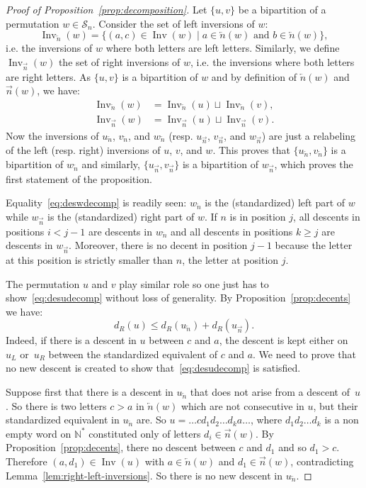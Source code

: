 \documentclass[Unicode]{cedram-alco}
\theoremstyle{definition}
\newcommand{\Sym}[1]{\mathcal{S}_{#1}}
\newcommand{\Symn}{\Sym{n}}
\DeclareMathOperator{\invs}{Inv}
\newcommand{\R}{{\overrightarrow{n}}}
\newcommand{\LL}{{\overleftarrow{n}}}
\newcommand{\dd}{d_R}
\begin{document}
\begin{proof}[Proof of Proposition~\ref{prop:decomposition}]
Let $\lbrace u, v \rbrace$ be a bipartition of a permutation $w \in \Symn$. Consider the set of left inversions of $w$:
$$
\invs_\LL(w)= \lbrace (a,c) \in \invs(w)\mid a \in \LL(w) \text{ and } b \in \LL(w) \rbrace,
$$
i.e. the inversions of $w$ where both letters are left letters. Similarly, we define $\invs_\R(w)$ the set of right inversions of $w$, i.e. the inversions where both letters are right letters. As $\lbrace u, v \rbrace$ is a bipartition of $w$ and by definition of  $\LL(w)$ and $\R(w)$, we have:
\begin{align*}
\invs_\LL(w) &= \invs_\LL(u) \sqcup \invs_\LL(v), \\
\invs_\R(w) &= \invs_\R(u) \sqcup \invs_\R(v).
\end{align*}
Now the inversions of $u_\LL$, $v_\LL$, and $w_\LL$ (resp. $u_\R$, $v_\R$, and $w_\R$) are just a relabeling of the left (resp. right) inversions of $u$, $v$, and $w$. This proves that $\lbrace u_\LL, v_\LL \rbrace$ is a bipartition of $w_\LL$ and similarly, $\lbrace u_\R, v_\R \rbrace$ is a bipartition of $w_\R$, which proves the first statement of the proposition. 


Equality~\eqref{eq:deswdecomp} is readily seen: $w_\LL$ is the (standardized) left part of $w$ while $w_\R$ is the (standardized) right part of $w$. If $n$ is in position $j$, all descents in positions $i < j-1$ are descents in $w_\LL$ and all descents in positions $k \geq j$ are descents in $w_\R$. Moreover, there is no decent in position $j-1$ because the letter at this position is strictly smaller than $n$, the letter at position $j$.

The permutation $u$ and $v$ play similar role so one just has to show~\eqref{eq:desudecomp} without loss of generality. By Proposition~\ref{prop:decents} we have:
\begin{equation*}
\dd(u) \leq \dd(u_\LL) + \dd(u_\R).
\end{equation*} 
Indeed, if there is a descent in $u$ between $c$ and $a$, the descent is kept either on~$u_L$ or~$u_R$ between the standardized equivalent of $c$ and $a$. We need to prove that no new descent is created to show that~\eqref{eq:desudecomp} is satisfied. 

Suppose first that there is a descent in $u_\LL$ that does not arise from a descent of~$u$. So there is two letters $c > a$ in $\LL(w)$ which are not consecutive in $u$, but their standardized equivalent in $u_\LL$ are. So $u=\dots c d_1d_2\dots d_k a\dots$, where $d_1d_2\dots d_k$ is a non empty word on $\mathbb N^*$ constituted only of letters  $d_i\in\R(w)$. By Proposition~\ref{prop:decents}, there no descent between $c$ and $d_1$ and so $d_1 > c$. Therefore $(a,d_1)\in\invs(u)$ with $a\in \LL(w)$ and $d_1\in\R(w)$, contradicting  Lemma~\ref{lem:right-left-inversions}. So there is no new descent in $u_\LL$.


\end{proof}
\end{document}
